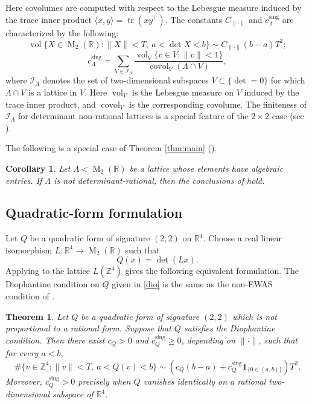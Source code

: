 \documentclass[reqno,11pt]{amsart}
\newtheorem{theorem}{Theorem}[section]
\newtheorem{cor}[cor]{Corollary}
\theoremstyle{definition}
\theoremstyle{remark}
\numberwithin{equation}{section}
\newcommand{\M}{\operatorname{M}}
\newcommand{\vol}{\operatorname{vol}}
\newcommand{\covol}{\operatorname{covol}}
\begin{document}
Here covolumes are computed with respect to the Lebesgue measure induced by
the trace inner product $\langle x,y\rangle=\operatorname{tr}(xy^{\intercal})$.
The constants $C_{\|\cdot\|}$ and $c_\Lambda^{\operatorname{sing}}$  are  characterized by the following:
\begin{equation}\label{eq:volume-asymptotic-intro}
\vol\{X\in\M_2(\mathbb R):\|X\|<T,\ a<\det X<b\}
\sim
C_{\|\cdot\|}(b-a)T^2;
\end{equation}
\begin{equation}\label{eq:sing-explicit}
c_\Lambda^{\operatorname{sing}}
=
\sum_{V\in\mathcal I_\Lambda}
\frac{\vol_V\{v\in V:\|v\|<1\}}
{\covol_V(\Lambda\cap V)},
\end{equation}
where $\mathcal I_\Lambda$ denotes the set of two-dimensional subspaces $V\subset\{\det=0\}$ for which $\Lambda\cap V$ is a lattice in $V$. Here $\vol_V$ is the Lebesgue measure on $V$ induced by the trace inner product, and $\covol_V$ is the corresponding covolume.
The finiteness of $\mathcal I_\Lambda$ for determinant non-rational lattices
is a special feature of the $2\times2$ case (see ).


The following is a special case of Theorem \ref{thm:main} (\cite[\S13]{KimOh_det}).
\begin{cor}\label{cor:algebraic}
Let $\Lambda<\M_2(\mathbb R)$ be a lattice  whose elements have
algebraic entries. If $\Lambda$ is not determinant-rational, then the
conclusions of  hold.
\end{cor}



\subsection*{Quadratic-form formulation}

Let $Q$ be a quadratic form of signature $(2,2)$ on $\mathbb R^4$.
Choose a real linear isomorphism $L:\mathbb R^4\to\M_2(\mathbb R)$ such that
$$
Q(x)=\det(Lx).
$$
Applying  to the lattice $L(\mathbb Z^4)$  gives the following equivalent formulation. The Diophantine condition on $Q$ given in \eqref{dio} is the same as the non-EWAS condition of \cite{eskin-margulis-mozes:2005}.

\begin{theorem}\label{thm:quadratic-form-version}
Let $Q$ be a quadratic form of signature $(2,2)$ which is not proportional to a rational form. Suppose that $Q$ satisfies
the Diophantine condition.  Then there exist
$c_{Q}>0$ and
$c_{Q}^{\operatorname{sing}}\ge0$, depending on $\|\cdot\|$, such that  for every $a<b$,
$$
\#\{v\in\mathbb Z^4:\|v\|<T,\ a<Q(v)<b\}
\sim
\left(
c_Q(b-a)
+
c_Q^{\operatorname{sing}}\mathbf 1_{\{0\in(a,b)\}}
\right)T^2.
$$
Moreover, $c_Q^{\operatorname{sing}}>0$ precisely when $Q$ vanishes
identically on a rational two-dimensional subspace of $\mathbb R^4$.
\end{theorem}
\end{document}
